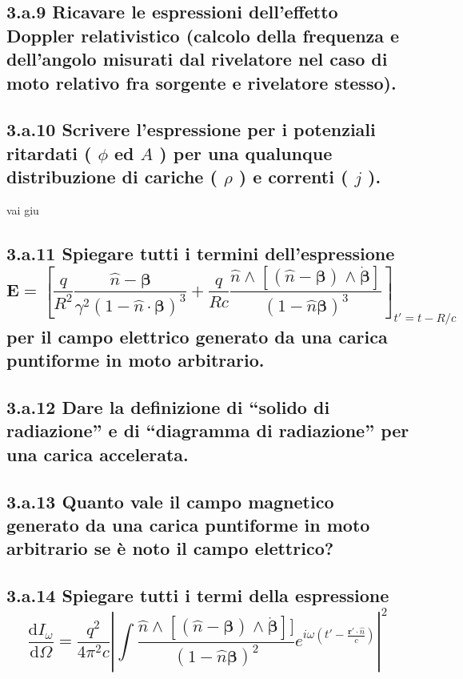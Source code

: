 \subsection*{3.a.9 Ricavare le espressioni dell’effetto Doppler relativistico (calcolo della frequenza e dell’angolo misurati dal rivelatore nel caso di moto relativo fra sorgente e rivelatore stesso).}

\subsection*{3.a.10 Scrivere l’espressione per i potenziali ritardati ( $\phi$ ed $A$ ) per una qualunque distribuzione di cariche ( $\rho$ ) e correnti ( $j$ ).}
vai giu
\subsection*{3.a.11 Spiegare tutti i termini dell’espressione 
\[
	\boldsymbol{E} = \left[ \frac{q}{R^2}\frac{\hat{n}- \boldsymbol{\beta}}{\gamma^2 \left( 1 - \hat{n} \cdot \boldsymbol{\beta} \right)^3 } + \frac{q}{Rc} \frac{\hat{n} \wedge \left[ \left( \hat{n} -\boldsymbol{\beta}  \right) \wedge \dot{\boldsymbol{\beta}} \right] }{\left( 1 - \hat{n} \boldsymbol{\beta}\right)^3 } \right]_{t' = t - R/c}  
\] 
per il campo elettrico generato da una carica puntiforme in moto arbitrario.}

\subsection*{3.a.12 Dare la definizione di “solido di radiazione” e di “diagramma di radiazione” per una carica accelerata.}

\subsection*{3.a.13 Quanto vale il campo magnetico generato da una carica puntiforme in moto arbitrario se è noto il campo elettrico?}

\subsection*{3.a.14 Spiegare tutti i termi della espressione 
\[
	\frac{\mbox{d} I_{\omega}}{\mbox{d} \Omega} = \frac{q^2}{4 \pi^2 c} \left| \int{ \frac{\hat{n} \wedge \left[ \left( \hat{n}-\boldsymbol{\beta}\right) \wedge \dot{\boldsymbol{\beta}} \right]]}{\left( 1- \hat{n} \boldsymbol{\beta}\right)^2} e^{i\omega \left( t' - \frac{\boldsymbol{r'} \cdot \hat{n}}{c} \right) }  }  \right|^2
\] 
}

